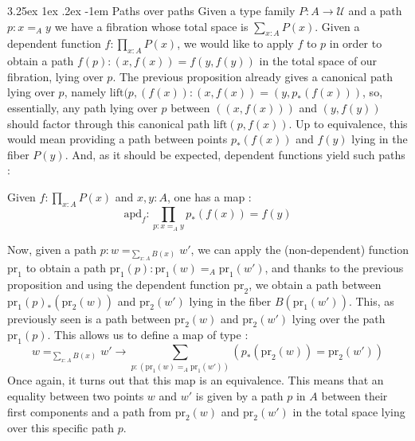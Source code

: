 \documentclass{report}
\makeatletter
\renewcommand\paragraph{\@startsection{paragraph}{5}{\z@}%
  {3.25ex \@plus1ex \@minus.2ex}%
  {-1em}%
  {\normalfont\normalsize\bfseries}}
\makeatother
\begin{document}
\paragraph{Paths over paths} Given a type family $P : A \rightarrow \mathcal{U}$ and a path $p : x=_A y$ we have a fibration whose total space is $\sum_{x : A} P(x)$. Given a dependent function $f : \prod_{x :A } P(x)$, we would like to apply $f$ to $p$ in order to obtain a path $f(p) : (x,f(x))=f(y,f(y))$ in the total space of our fibration, lying over $p$. The previous proposition already gives a canonical path lying over $p$, namely $\mathrm{lift}(p,(f(x)) : (x,f(x)) = (y,p_*(f(x)))$, so, essentially, any path lying over $p$ between $((x,f(x)))$ and $(y,f(y))$ should factor through this canonical path $\mathrm{lift}(p,f(x))$. Up to equivalence, this would mean providing a path between points $p_*(f(x))$ and $f(y)$ lying in the fiber $P(y)$. And, as it should be expected, dependent functions yield such paths : 
\begin{prop}
Given $f : \prod_{x : A} P(x)$ and $x,y : A$, one has a map : 
$$\mathrm{apd}_f : \prod_{p : x=_A y} p_*(f(x))=f(y)$$
\end{prop}
Now, given a path $p :w =_{\sum_{x : A} B(x)} w'$, we can apply the (non-dependent) function $\mathrm{pr}_1$ to obtain a path $\mathrm{pr}_1(p) : \mathrm{pr}_1(w) =_A \mathrm{pr}_1(w')$, and thanks to the previous proposition and using the dependent function $\mathrm{pr}_2$, we obtain a path between $\mathrm{pr}_1(p)_*(\mathrm{pr}_2(w))$ and $\mathrm{pr}_2(w')$ lying in the fiber $B(\mathrm{pr}_1(w'))$. This, as previously seen is a path between $\mathrm{pr}_2(w)$ and $\mathrm{pr}_2(w')$ lying over the path $\mathrm{pr}_1(p)$. This allows us to define a map of type : 
$$w=_{\sum_{x : A} B(x)} w' \rightarrow \sum_{p : (\mathrm{pr}_1(w)=_A \mathrm{pr}_1(w'))} (p_*(\mathrm{pr}_2(w))=\mathrm{pr}_2(w'))$$
Once again, it turns out that this map is an equivalence.
This means that an equality between two points $w$ and $w'$ is given by a path $p$ in $A$ between their first components and a path from $\mathrm{pr}_2(w)$ and $\mathrm{pr}_2(w')$ in the total space lying over this specific path $p$.
\end{document}
